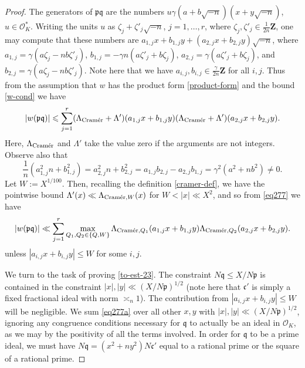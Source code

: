 \documentclass[11pt,reqno]{amsart}
\numberwithin{equation}{section}
\theoremstyle{definition}
\theoremstyle{remark}
\newcommand{\mf}{\mathfrak}
\renewcommand{\le}{\leqslant}
\newcommand\Z{\mathbf{Z}}
\newcommand\cramer{{\textnormal{Cram\'er}}}
\renewcommand\O{\mathcal{O}}
\begin{document}
\begin{proof}
The generators of $\mf{p}\mf{q}$ are the numbers $u \gamma (a + b\sqrt{-n})(x + y\sqrt{-n})$, $u \in \O^*_K$. Writing the units $u$ as $\zeta_j + \zeta'_j \sqrt{-n}$, $j = 1,\dots, r$, where $\zeta_j, \zeta'_j \in \frac{1}{2n}\Z$, one may compute that these numbers are $a_{1,j}x + b_{1,j}y + (a_{2,j} x + b_{2,j} y)\sqrt{-n}$, where $a_{1,j} = \gamma( a\zeta_j - nb \zeta'_j)$,  $b_{1,j} = -\gamma n( a \zeta'_j + b \zeta_j)$, $a_{2,j} = \gamma (a\zeta'_j + b \zeta_j)$, and $b_{2,j} = \gamma (a\zeta_j-nb\zeta'_j)$. Note here that we have $a_{i,j}, b_{i,j} \in \frac{\gamma}{2n} \Z$ for all $i,j$. Thus from the assumption that $w$ has the product form \cref{product-form} and the bound \cref{w-cond} we have 
\begin{equation}\label{eq277} |w(\mf{p}\mf{q})| \le \sum_{j = 1}^r (\Lambda_{\cramer} + \Lambda') (a_{1,j}x + b_{1,j}y) (\Lambda_{\cramer} + \Lambda')( a_{2,j}x + b_{2,j}y ). \end{equation}
Here, $\Lambda_{\cramer}$ and $\Lambda'$ take the value zero if the arguments are not integers. Observe also that 
\begin{equation}\label{non-deg} \frac{1}{n}(a_{1,j}^2 n + b_{1,j}^2) = a_{2,j}^2 n + b_{2,j}^2 =  a_{1,j} b_{2,j} - a_{2,j} b_{1,j} = \gamma^2 (a^2 + nb^2) \neq 0.\end{equation}
Let $W :=  X^{1/100}$. Then, recalling the definition \cref{cramer-def}, we have the pointwise bound $\Lambda'(x) \ll \Lambda_{\cramer, W}(x)$ for $W < |x| \ll X^2$, and so from \cref{eq277} we have
\begin{equation}\label{eq277a} |w(\mf{p}\mf{q})| \ll \sum_{j = 1}^r \max_{Q_1, Q_2 \in \{Q, W\}} \Lambda_{\cramer, Q_1} (a_{1,j}x + b_{1,j}y) \Lambda_{\cramer, Q_2}( a_{2,j}x + b_{2,j}y ). \end{equation}
unless $|a_{i,j} x + b_{i,j} y| \le W$ for some $i,j$.

We turn to the task of proving \cref{to-est-23}.  The constraint $N\mf{q} \le X/N\mf{p}$ is contained in the constraint $|x|, |y| \ll (X/N\mf{p})^{1/2}$ (note here that $\mf{c}'$ is simply a fixed fractional ideal with norm $\asymp_n 1$). The contribution from $|a_{i,j} x + b_{i,j} y| \le W$ will be negligible. We sum \cref{eq277a} over all other $x,y$ with $|x|, |y| \ll (X/N\mf{p})^{1/2}$, ignoring any congruence conditions necessary for $\mf{q}$ to actually be an ideal in $\O_K$, as we may by the positivity of all the terms involved. In order for $\mf{q}$ to be a prime ideal, we must have $N\mf{q} = (x^2 + ny^2) N \mf{c}'$ equal to a rational prime or the square of a rational prime.



\end{proof}
\end{document}
